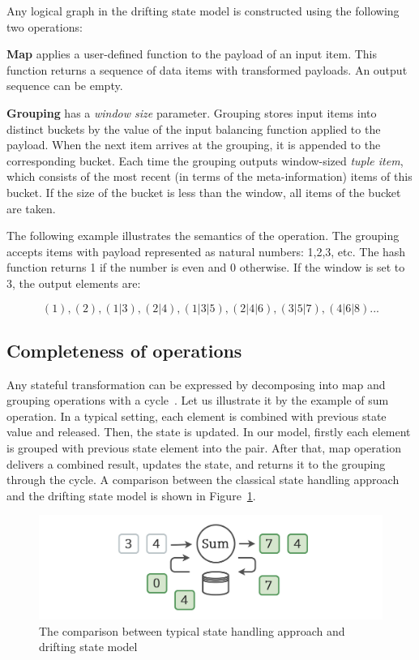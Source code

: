 Any logical graph in the drifting state model is constructed using the following two operations:

{\bf Map} applies a user-defined function to the payload of an input item. This function returns a sequence of data items with transformed payloads. An output sequence can be empty.

{\bf Grouping} has a {\it window size} parameter. Grouping stores input items into distinct buckets by the value of the input balancing function applied to the payload. When the next item arrives at the grouping, it is appended to the corresponding bucket. Each time the grouping outputs window-sized {\it tuple item}, which consists of the most recent (in terms of the meta-information) items of this bucket. If the size of the bucket is less than the window, all items of the bucket are taken.

The following example illustrates the semantics of the operation. The grouping accepts items with payload represented as natural numbers: 1,2,3, etc. The hash function returns 1 if the number is even and 0 otherwise. If the window is set to 3, the output elements are:

\[(1), (2), (1|3), (2|4), (1|3|5), (2|4|6), (3|5|7), (4|6|8)...\]

\subsection{Completeness of operations}

Any stateful transformation can be expressed by decomposing into map and grouping operations with a cycle~\cite{we2018adbis}. Let us illustrate it by the example of sum operation. In a typical setting, each element is combined with previous state value and released. Then, the state is updated. In our model, firstly each element is grouped with previous state element into the pair. After that, map operation delivers a combined result, updates the state, and returns it to the grouping through the cycle. A comparison between the classical state handling approach and the drifting state model is shown in Figure~\ref{classical-drifting}.

\begin{figure}[htbp]
  \centering
  \includegraphics[width=.49\textwidth]{pics/classical-drifting}
  \caption{The comparison between typical state handling approach and drifting state model}
  \label {classical-drifting}
\end{figure}

